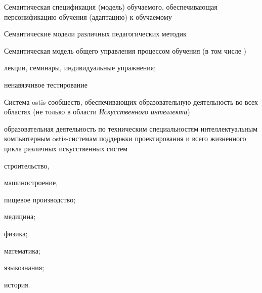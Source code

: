 Семантическая спецификация (модель) обучаемого, обеспечивающая персонификацию обучения (адаптацию) к обучаемому

Семантические модели различных педагогических методик

Семантическая модель общего управления процессом обучения (в том числе )
\begin{textitemize}
	\item лекции, семинары, индивидуальные упражнения;
	\item ненавязчивое тестирование
\end{textitemize}

Система ostis-сообществ, обеспечивающих образовательную деятельность во всех областях (не только в области \textit{Искусственного интеллекта})
\begin{textitemize}
	\item образовательная деятельность по техническим специальностям интеллектуальным компьютерным ostis-системам поддержки проектирования и всего жизненного цикла различных искусственных систем
	\begin{textitemize}
		\item строительство,
		\item машиностроение,
		\item пищевое производство;
	\end{textitemize}
	\item медицина;
	\item физика;
	\item математика;
	\item языкознания;
	\item история.
\end{textitemize}

\begin{SCn}
	\begin{scnindent}
		\begin{scnindent}
		\end{scnindent} 
	\end{scnindent} 
\end{SCn}